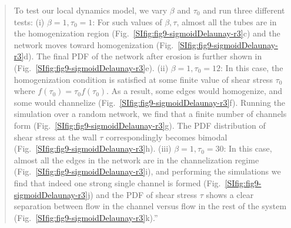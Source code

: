 \documentclass{article}
\begin{document}
{\begin{quote}
    To test our local dynamics model, we vary $\beta$ and $\tau_0$ and run three different tests: (i) $\beta=1,\tau_0=1$: For such values of $\beta,\tau$, almost all the tubes are in the homogenization region (Fig.~\ref{SIfig:fig9-sigmoidDelaunay-r3}c) and the network moves toward homogenization (Fig.~\ref{SIfig:fig9-sigmoidDelaunay-r3}d). The final PDF of the network after erosion is further shown in (Fig.~\ref{SIfig:fig9-sigmoidDelaunay-r3}e). (ii) $\beta=1, \tau_0=12$: In this case, the homogenization condition is satisfied at some finite value of shear stress $\tau_0$ where $f(\tau_0) = \tau_0 f(\tau_0)$. As a result, some edges would homogenize, and some would channelize (Fig.~\ref{SIfig:fig9-sigmoidDelaunay-r3}f). Running the simulation over a random network, we find that a finite number of channels form (Fig.~\ref{SIfig:fig9-sigmoidDelaunay-r3}g). The PDF distribution of shear stress at the wall $\tau$ correspondingly becomes bimodal (Fig.~\ref{SIfig:fig9-sigmoidDelaunay-r3}h). (iii) $\beta=1, \tau_0=30$: In this case, almost all the edges in the network are in the channelization regime  (Fig.~\ref{SIfig:fig9-sigmoidDelaunay-r3}i), and performing the simulations we find that indeed one strong single channel is formed (Fig.~\ref{SIfig:fig9-sigmoidDelaunay-r3}j) and the PDF of shear stress $\tau$ shows a clear separation between flow in the channel versus flow in the rest of the system (Fig.~\ref{SIfig:fig9-sigmoidDelaunay-r3}k).''
\end{quote}
}
\end{document}
